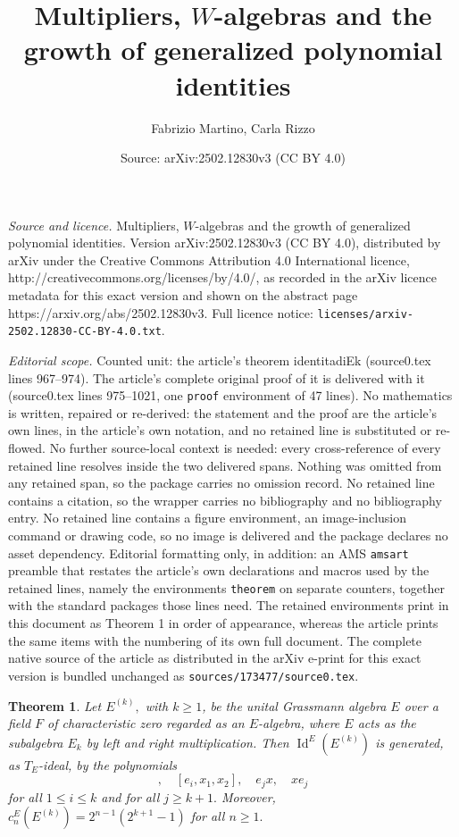 \documentclass[10pt,a4paper]{amsart}
\title{Multipliers, $W$-algebras and the growth of generalized polynomial identities}
\author{Fabrizio Martino, Carla Rizzo}
\date{Source: arXiv:2502.12830v3 (CC BY 4.0)}
\newtheorem{theorem}{Theorem}
\DeclareMathOperator{\I}{Id}
\begin{document}
\maketitle

\noindent\emph{Source and licence.} Multipliers, $W$-algebras and the growth of generalized polynomial identities. Version arXiv:2502.12830v3 (CC BY 4.0), distributed by arXiv under the Creative Commons Attribution 4.0 International licence, http://creativecommons.org/licenses/by/4.0/, as recorded in the arXiv licence metadata for this exact version and shown on the abstract page https://arxiv.org/abs/2502.12830v3. Full licence notice: \texttt{licenses/arxiv-2502.12830-CC-BY-4.0.txt}.\par\smallskip

\noindent\textit{Editorial scope.} Counted unit: the article's theorem identitadiEk (source0.tex lines 967--974). The article's complete original proof of it is delivered with it (source0.tex lines 975--1021, one \texttt{proof} environment of 47 lines). No mathematics is written, repaired or re-derived: the statement and the proof are the article's own lines, in the article's own notation, and no retained line is substituted or re-flowed.  No further source-local context is needed: every cross-reference of every retained line resolves inside the two delivered spans.  Nothing was omitted from any retained span, so the package carries no omission record.  No retained line contains a citation, so the wrapper carries no bibliography and no bibliography entry.  No retained line contains a figure environment, an image-inclusion command or drawing code, so no image is delivered and the package declares no asset dependency.  Editorial formatting only, in addition: an AMS \texttt{amsart} preamble that restates the article's own declarations and macros used by the retained lines, namely the environments \texttt{theorem} on separate counters, together with the standard packages those lines need.  The retained environments print in this document as Theorem 1 in order of appearance, whereas the article prints the same items with the numbering of its own full document.  The complete native source of the article as distributed in the arXiv e-print for this exact version is bundled unchanged as \texttt{sources/173477/source0.tex}.
\begin{theorem}\label{identitadiEk}
    Let $E^{(k)},$ with $k\geq 1$, be the unital Grassmann algebra $E$ over a field $F$ of characteristic zero regarded as an $E$-algebra, where $E$ acts as the subalgebra $E_k$ by left and right multiplication.
    Then $\I^E(E^{(k)})$ is generated, as $T_E$-ideal, by the polynomials 
    \begin{equation*}
    [x_1,x_2,x_3], \quad [e_i,x_1,x_2], \quad e_jx, \quad xe_j
\end{equation*}
for all $1\leq i\leq k$ and for all $j\geq k+1.$ Moreover, $c^E_n(E^{(k)}) = 2^{n-1}(2^{k+1}-1)$ for all $n\geq 1.$
\end{theorem}
\end{document}
